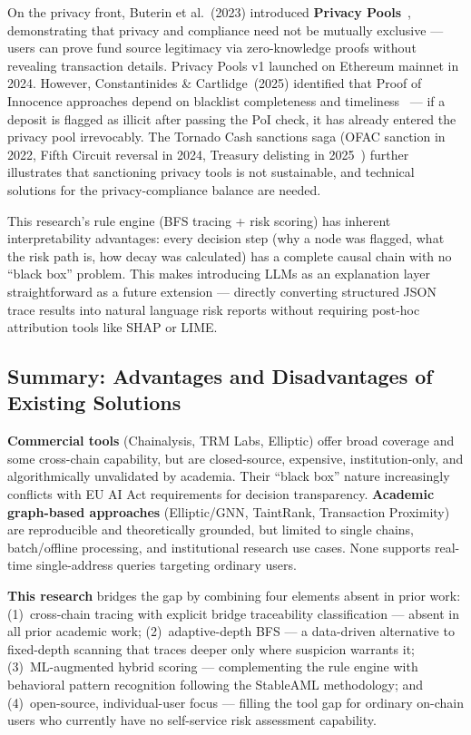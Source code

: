 \documentclass[12pt,a4paper]{article}
\begin{document}
On the privacy front, Buterin et al.~(2023) introduced \textbf{Privacy Pools}~\cite{buterin2023}, demonstrating that privacy and compliance need not be mutually exclusive --- users can prove fund source legitimacy via zero-knowledge proofs without revealing transaction details. Privacy Pools v1 launched on Ethereum mainnet in 2024. However, Constantinides \& Cartlidge~(2025) identified that Proof of Innocence approaches depend on blacklist completeness and timeliness~\cite{constantinides2025} --- if a deposit is flagged as illicit after passing the PoI check, it has already entered the privacy pool irrevocably. The Tornado Cash sanctions saga (OFAC sanction in 2022, Fifth Circuit reversal in 2024, Treasury delisting in 2025~\cite{brownworth2024}) further illustrates that sanctioning privacy tools is not sustainable, and technical solutions for the privacy-compliance balance are needed.

This research's rule engine (BFS tracing + risk scoring) has inherent interpretability advantages: every decision step (why a node was flagged, what the risk path is, how decay was calculated) has a complete causal chain with no ``black box'' problem. This makes introducing LLMs as an explanation layer straightforward as a future extension --- directly converting structured JSON trace results into natural language risk reports without requiring post-hoc attribution tools like SHAP or LIME.

\subsection{Summary: Advantages and Disadvantages of Existing Solutions}

\textbf{Commercial tools} (Chainalysis, TRM Labs, Elliptic) offer broad coverage and some cross-chain capability, but are closed-source, expensive, institution-only, and algorithmically unvalidated by academia. Their ``black box'' nature increasingly conflicts with EU AI Act requirements for decision transparency. \textbf{Academic graph-based approaches} (Elliptic/GNN, TaintRank, Transaction Proximity) are reproducible and theoretically grounded, but limited to single chains, batch/offline processing, and institutional research use cases. None supports real-time single-address queries targeting ordinary users.

\textbf{This research} bridges the gap by combining four elements absent in prior work: (1)~cross-chain tracing with explicit bridge traceability classification --- absent in all prior academic work; (2)~adaptive-depth BFS --- a data-driven alternative to fixed-depth scanning that traces deeper only where suspicion warrants it; (3)~ML-augmented hybrid scoring --- complementing the rule engine with behavioral pattern recognition following the StableAML methodology; and (4)~open-source, individual-user focus --- filling the tool gap for ordinary on-chain users who currently have no self-service risk assessment capability.
\end{document}
